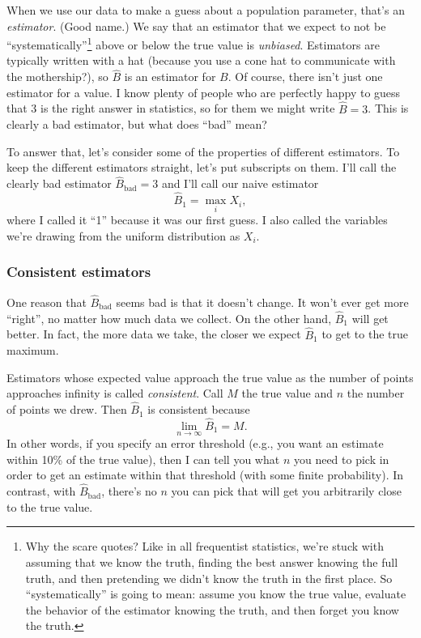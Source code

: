 When we use our data to make a guess about a population parameter,
that's an \emph{estimator}. (Good name.) We say that an estimator that
we expect to not be ``systematically''\footnote{Why the scare quotes?
  Like in all frequentist statistics, we're stuck with assuming that we
  know the truth, finding the best answer knowing the full truth, and
  then pretending we didn't know the truth in the first place. So
  ``systematically'' is going to mean: assume you know the true value,
  evaluate the behavior of the estimator knowing the truth, and then
  forget you know the truth.} above or below the true value is
\emph{unbiased}. Estimators are typically written with a hat (because
you use a cone hat to communicate with the mothership?), so \(\hat{B}\)
is an estimator for \(B\). Of course, there isn't just one estimator for
a value. I know plenty of people who are perfectly happy to guess that 3
is the right answer in statistics, so for them we might write
\(\hat{B} = 3\). This is clearly a bad estimator, but what does ``bad''
mean?

To answer that, let's consider some of the properties of different
estimators. To keep the different estimators straight, let's put
subscripts on them. I'll call the clearly bad estimator
\(\hat{B}_\mathrm{bad} = 3\) and I'll call our naive estimator \[
\hat{B}_1 = \max_i X_i,
\] where I called it ``1'' because it was our first guess. I also called
the variables we're drawing from the uniform distribution as \(X_i\).

\subsubsection{Consistent estimators}\label{consistent-estimators}

One reason that \(\hat{B}_\mathrm{bad}\) seems bad is that it doesn't
change. It won't ever get more ``right'', no matter how much data we
collect. On the other hand, \(\hat{B}_1\) will get better. In fact, the
more data we take, the closer we expect \(\hat{B}_1\) to get to the true
maximum.

Estimators whose expected value approach the true value as the number of
points approaches infinity is called \emph{consistent}. Call \(M\) the
true value and \(n\) the number of points we drew. Then \(\hat{B}_1\) is
consistent because \[
\lim_{n \to \infty} \hat{B}_1 = M.
\] In other words, if you specify an error threshold (e.g., you want an
estimate within 10\% of the true value), then I can tell you what \(n\)
you need to pick in order to get an estimate within that threshold (with
some finite probability). In contrast, with \(\hat{B}_\mathrm{bad}\),
there's no \(n\) you can pick that will get you arbitrarily close to the
true value.

